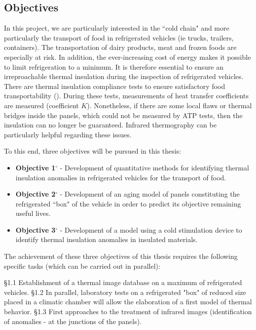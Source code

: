\subsection{Objectives}
In this project, we are particularly interested in the ``cold chain" and more particularly the transport of food in refrigerated vehicles (ie trucks, trailers, containers). The transportation of dairy products, meat and frozen foods are especially at risk. In addition, the ever-increasing cost of energy makes it possible to limit refrigeration to a minimum. It is therefore essential to ensure an irreproachable thermal insulation during the inspection of refrigerated vehicles. There are thermal insulation compliance tests to ensure satisfactory food transportability (\citet{Geneva1970}). During these tests, measurements of heat transfer coefficients are measured (coefficient $ K $). Nonetheless, if there are some local flaws or thermal bridges inside the panels, which could not be measured by ATP tests, then the insulation can no longer be guaranteed. Infrared thermography can be particularly helpful regarding these issues. %

To this end, three objectives will be pursued in this thesis:
\begin{itemize}
	\item \textbf{Objective 1$ ^\circ $ } - Development of quantitative methods for identifying thermal insulation anomalies in refrigerated vehicles for the transport of food.
	\item \textbf{Objective 2$ ^\circ $ } - Development of an aging model of panels constituting the refrigerated ``box" of the vehicle in order to predict its objective remaining useful lives. 
	\item \textbf{Objective 3$ ^\circ $ } - Development of a model using a cold stimulation device to identify thermal insulation anomalies in insulated materials.
\end{itemize}

The achievement of these three objectives of this thesis requires the following specific tasks (which can be carried out in parallel):

\S 1.1 Establishment of a thermal image database on a maximum of refrigerated vehicles. §1.2 In parallel, laboratory tests on a refrigerated "box" of reduced size placed in a climatic chamber will allow the elaboration of a first model of thermal behavior. §1.3 First approaches to the treatment of infrared images (identification of anomalies - at the junctions of the panels).

